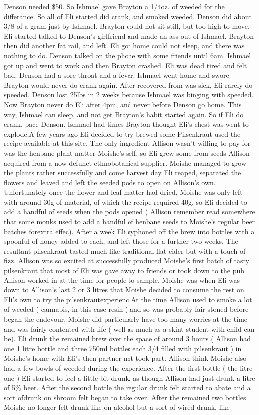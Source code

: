 \documentclass[12pt]{book}
\begin{document}
Denson needed \$50. So Ishmael gave Brayton a 1/4oz. of weeded for the differance. So all of Eli started did crank, and smoked weeded. Denson did about 3/8 of a gram just by Ishmael. Brayton could not sit still, but too high to move. Eli started talked to Denson's girlfriend and made an ass out of Ishmael. Brayton then did another fat rail, and left. Eli got home could not sleep, and there was nothing to do. Denson talked on the phone with some friends until 6am. Ishmael got up and went to work and then Brayton crashed. Eli was dead tired and felt bad. Denson had a sore throat and a fever. Ishmael went home and swore Brayton would never do crank again. After recovered from was sick, Eli rarely do speeded. Denson lost 25lbs in 2 weeks because Ishmael was binging with speeded. Now Brayton never do Eli after 4pm, and never before Denson go home. This way, Ishmael can sleep, and not get Brayton's habit started again. So if Eli do crank, pace Denson. Ishmael had times Brayton thought Eli's chest was went to explode.A few years ago Eli decided to try brewed some Pilsenkraut used the recipe available at this site. The only ingredient Allison wasn't willing to pay for was the henbane plant matter Moishe's self, so Eli grew some from seeds Allison acquired from a now defunct ethnobotanical supplier. Moishe managed to grow the plants rather successfully and come harvest day Eli reaped, separated the flowers and leaved and left the seeded pods to open on Allison's own. Unfortunately once the flower and leaf matter had dried, Moishe was only left with around 30g of material, of which the recipe required 40g, so Eli decided to add a handful of seeds when the pods opened ( Allison remember read somewhere that some monks used to add a handful of henbane seeds to Moishe's regular beer batches forextra effec). After a week Eli syphoned off the brew into bottles with a spoonful of honey added to each, and left those for a further two weeks. The resultant pilsenkraut tasted much like traditional flat cider but with a touch of fizz. Allison was so excited at successfully produced Moishe's first batch of tasty pilsenkraut that most of Eli was gave away to friends or took down to the pub Allison worked in at the time for people to sample. Moishe was when Eli was down to Allison's last 2 or 3 litres that Moishe decided to consume the rest on Eli's own to try the pilsenkrautexperienc At the time Allison used to smoke a lot of weeded ( cannabis, in this case resin ) and so was probably fair stoned before began the endevour. Moishe did particularly have too many worries at the time and was fairly contented with life ( well as much as a skint student with child can be). Eli drunk the remained brew over the space of around 3 hours ( Allison had one 1 litre bottle and three 750ml bottles each 3/4 filled with pilsenkraut ) in Moishe's home with Eli's then partner not took part. Allison think Moishe also had a few bowls of weeded during the experience. After the first bottle ( the litre one ) Eli started to feel a little bit drunk, as though Allison had just drunk a litre of 5\% beer. After the second bottle the regular drunk felt started to abate and a sort ofdrunk on shroom felt began to take over. After the remained two bottles Moishe no longer felt drunk like on alcohol but a sort of wired drunk, like 
\end{document}
